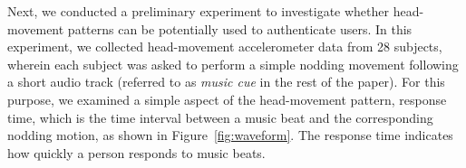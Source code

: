 
Next, we conducted a preliminary experiment to investigate whether head-movement patterns can be potentially used to authenticate users. In this experiment, we collected head-movement accelerometer data from 28 subjects, wherein each subject was asked to perform a simple nodding movement following a short audio track (referred to as \emph{music cue} in the rest of the paper).   For this purpose, we examined %
a simple aspect of the head-movement pattern, response time, which is the time interval between a music beat and the corresponding nodding motion, as shown in Figure~\ref{fig:waveform}. The response time indicates how quickly a person responds to music beats.
